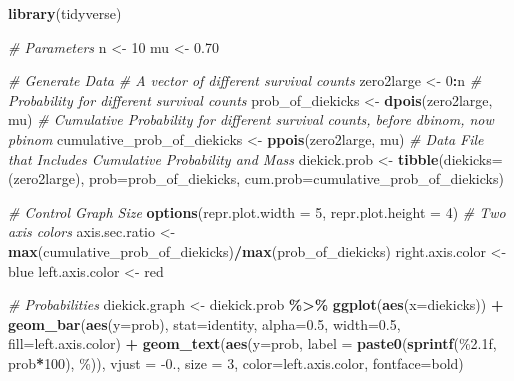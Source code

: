 \documentclass[
]{book}
\newenvironment{Shaded}{\begin{snugshade}}{\end{snugshade}}
\newcommand{\CommentTok}[1]{\textcolor[rgb]{0.56,0.35,0.01}{\textit{#1}}}
\newcommand{\DataTypeTok}[1]{\textcolor[rgb]{0.13,0.29,0.53}{#1}}
\newcommand{\DecValTok}[1]{\textcolor[rgb]{0.00,0.00,0.81}{#1}}
\newcommand{\FloatTok}[1]{\textcolor[rgb]{0.00,0.00,0.81}{#1}}
\newcommand{\KeywordTok}[1]{\textcolor[rgb]{0.13,0.29,0.53}{\textbf{#1}}}
\newcommand{\NormalTok}[1]{#1}
\newcommand{\OperatorTok}[1]{\textcolor[rgb]{0.81,0.36,0.00}{\textbf{#1}}}
\newcommand{\StringTok}[1]{\textcolor[rgb]{0.31,0.60,0.02}{#1}}
\begin{document}
\begin{Shaded}
\begin{Highlighting}[]
\KeywordTok{library}\NormalTok{(tidyverse)}

\CommentTok{\# Parameters}
\NormalTok{n \textless{}{-}}\StringTok{ }\DecValTok{10}
\NormalTok{mu \textless{}{-}}\StringTok{ }\FloatTok{0.70}

\CommentTok{\# Generate Data}
\CommentTok{\# A vector of different survival counts}
\NormalTok{zero2large \textless{}{-}}\StringTok{ }\DecValTok{0}\OperatorTok{:}\NormalTok{n}
\CommentTok{\# Probability for different survival counts}
\NormalTok{prob\_of\_diekicks \textless{}{-}}\StringTok{ }\KeywordTok{dpois}\NormalTok{(zero2large, mu)}
\CommentTok{\# Cumulative Probability for different survival counts, before dbinom, now pbinom}
\NormalTok{cumulative\_prob\_of\_diekicks \textless{}{-}}\StringTok{ }\KeywordTok{ppois}\NormalTok{(zero2large, mu)}
\CommentTok{\# Data File that Includes Cumulative Probability and Mass}
\NormalTok{diekick.prob \textless{}{-}}\StringTok{ }\KeywordTok{tibble}\NormalTok{(}\DataTypeTok{diekicks=}\NormalTok{(zero2large), }\DataTypeTok{prob=}\NormalTok{prob\_of\_diekicks, }\DataTypeTok{cum.prob=}\NormalTok{cumulative\_prob\_of\_diekicks)}

\CommentTok{\# Control Graph Size}
\KeywordTok{options}\NormalTok{(}\DataTypeTok{repr.plot.width =} \DecValTok{5}\NormalTok{, }\DataTypeTok{repr.plot.height =} \DecValTok{4}\NormalTok{)}
\CommentTok{\# Two axis colors}
\NormalTok{axis.sec.ratio \textless{}{-}}\StringTok{ }\KeywordTok{max}\NormalTok{(cumulative\_prob\_of\_diekicks)}\OperatorTok{/}\KeywordTok{max}\NormalTok{(prob\_of\_diekicks)}
\NormalTok{right.axis.color \textless{}{-}}\StringTok{ \textquotesingle{}blue\textquotesingle{}}
\NormalTok{left.axis.color \textless{}{-}}\StringTok{ \textquotesingle{}red\textquotesingle{}}

\CommentTok{\# Probabilities}
\NormalTok{diekick.graph \textless{}{-}}\StringTok{ }\NormalTok{diekick.prob }\OperatorTok{\%\textgreater{}\%}
\StringTok{    }\KeywordTok{ggplot}\NormalTok{(}\KeywordTok{aes}\NormalTok{(}\DataTypeTok{x=}\NormalTok{diekicks)) }\OperatorTok{+}
\StringTok{    }\KeywordTok{geom\_bar}\NormalTok{(}\KeywordTok{aes}\NormalTok{(}\DataTypeTok{y=}\NormalTok{prob),}
             \DataTypeTok{stat=}\StringTok{\textquotesingle{}identity\textquotesingle{}}\NormalTok{, }\DataTypeTok{alpha=}\FloatTok{0.5}\NormalTok{, }\DataTypeTok{width=}\FloatTok{0.5}\NormalTok{, }\DataTypeTok{fill=}\NormalTok{left.axis.color) }\OperatorTok{+}
\StringTok{    }\KeywordTok{geom\_text}\NormalTok{(}\KeywordTok{aes}\NormalTok{(}\DataTypeTok{y=}\NormalTok{prob,}
                  \DataTypeTok{label =} \KeywordTok{paste0}\NormalTok{(}\KeywordTok{sprintf}\NormalTok{(}\StringTok{\textquotesingle{}\%2.1f\textquotesingle{}}\NormalTok{, prob}\OperatorTok{*}\DecValTok{100}\NormalTok{), }\StringTok{\textquotesingle{}\%\textquotesingle{}}\NormalTok{)),}
              \DataTypeTok{vjust =} \FloatTok{{-}0.}\NormalTok{, }\DataTypeTok{size =} \DecValTok{3}\NormalTok{, }\DataTypeTok{color=}\NormalTok{left.axis.color, }\DataTypeTok{fontface=}\StringTok{\textquotesingle{}bold\textquotesingle{}}\NormalTok{)}


\end{Highlighting}
\end{Shaded}
\end{document}
